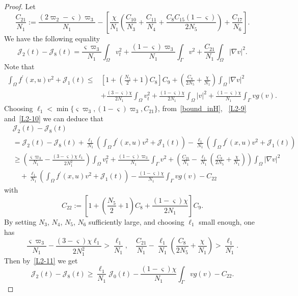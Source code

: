 \documentclass{elsarticle}
\begin{document}
\begin{proof}
Let
\[
\frac{C_{21}}{N_1}:=\frac{(2\varpi_2-\varsigma)\varpi_3}{N_1}-\left[\frac{\chi}{N_1}\left(\frac{C_{10}}{N_3}+\frac{C_{11}}{N_4} + \frac{C_8 C_{15}(1-\varsigma)}{2N_5}\right) + \frac{C_{17}}{N_6}\right] .
\]
We have the following equality
\begin{equation}\label{L2-9}
\mathcal{J}_2(t)-\mathcal{J}_{8}(t)=\frac{\varsigma\varpi_3}{N_1}\int_{\Omega}v_{t}^2+\frac{(1-\varsigma)\varpi_3}{N_1}\int_{\Gamma}v^2+\frac{C_{21}}{N_1}\int_{\Omega}|\nabla v|^2.
\end{equation}
Note that
\begin{equation}\label{L2-10}
\begin{split}
\int_{\Omega}f^{\prime}(x, u)v^2 + \mathcal{J}_{1}(t)\leqslant &\left[1+ \left(\frac{N_5}{2}+1\right)C_8\right]C_9 +\left(\frac{C_8}{2N_5} + \frac{\chi}{N_1}\right)\int_{\Omega}|\nabla v|^2\\
&+ \frac{(3-\varsigma)\chi}{2N_1}\int_{\Omega}v_{t}^2 + \frac{(1-\varsigma)\chi}{2N_1}\int_{\Omega}|v|^2 + \frac{(1-\varsigma)\chi}{N_1}\int_{\Gamma} vg(v).
\end{split}
\end{equation}
Choosing $\ell_1< \min\{\varsigma\varpi_3, (1-\varsigma)\varpi_3, C_{21}\}$, from~\eqref{bound_inH}, ~\eqref{L2-9} and~\eqref{L2-10} we can deduce that
\begin{equation}\label{L2-11}
\begin{split}
&\mathcal{J}_2(t)-\mathcal{J}_{8}(t)\\
&=\mathcal{J}_2(t)-\mathcal{J}_{8}(t)+ \frac{\ell_1}{N_1}\left(\int_{\Omega}f^{\prime}(x, u)v^2 + \mathcal{J}_{1}(t)\right)-\frac{\ell_1}{N_1}\left(\int_{\Omega}f^{\prime}(x, u)v^2 + \mathcal{J}_{1}(t)\right)\\
&\geqslant\left(\frac{\varsigma\varpi_3}{N_1}-\frac{(3-\varsigma)\chi\ell_1}{2N^2_1}\right)\int_{\Omega}v_{t}^2 +\frac{(1-\varsigma)\varpi_3}{N_1}\int_{\Gamma}v^2+\left(\frac{C_{21}}{N_1}-\frac{\ell_1}{N_1}\left(\frac{C_8}{2N_5} + \frac{\chi}{N_1}\right)\right)\int_{\Omega}|\nabla v|^2\\
&\quad+ \frac{\ell_1}{N_1}\left(\int_{\Omega}f^{\prime}(x, u)v^2 + \mathcal{J}_{1}(t)\right) -\frac{(1-\varsigma)\chi}{N_1}\int_{\Gamma} vg(v)- C_{22}
\end{split}
\end{equation}
with
\[
C_{22}:=\left[1+ \left(\frac{N_5}{2}+1\right)C_8+\frac{(1-\varsigma)\chi}{2N_1}\right]C_9.
\]
By setting $N_3$, $N_4$, $N_5$, $N_6$ sufficiently large, and choosing $\ell_1$ small enough, one has
\[
\frac{\varsigma\varpi_3}{N_1}-\frac{(3-\varsigma)\chi\ell_1}{2N^2_1}> \frac{\ell_1}{N_1},\quad \frac{C_{21}}{N_1}-\frac{\ell_1}{N_1}\left(\frac{C_8}{2N_5} + \frac{\chi}{N_1}\right)> \frac{\ell_1}{N_1}.
\]
Then by~\eqref{L2-11} we get
\begin{equation} \label{L2-12}
\mathcal{J}_2(t)-\mathcal{J}_{8}(t) \geqslant \frac{\ell_1}{N_1}\mathcal{J}_0(t)-\frac{(1-\varsigma)\chi}{N_1}\int_{\Gamma} vg(v)- C_{22}.
\end{equation}


\end{proof}
\end{document}
